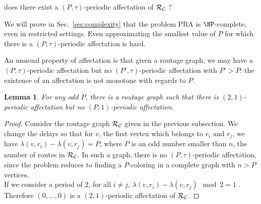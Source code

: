 \documentclass[a4paper,10pt]{article}
\newtheorem{lemma}[theorem]{Lemma}
\begin{document}
       does there exist a $(P,\tau)$-periodic affectation of $\cal R_{\cal C}$ ?


      We will prove in Sec.~\ref{sec:complexity} that the problem PRA is $\NP$-complete, even in restricted settings.
      Even approximating the smallest value of $P$ for which there is a $(P,\tau)$-periodic affectation is hard.

      An unusual property of affectation is that given a routage graph, we may have a $(P,\tau)$-periodic affectation but no
      $(P',\tau)$-periodic affectation with $P' > P$: the existence of an affectation is not monotone with regards to $P$.

	\begin{lemma} 
	 For any odd $P$, there is a routage graph such that there is $(2,1)$-periodic affectation but no $(P,1)$-periodic affectation.
	\end{lemma}
\begin{proof}

      Consider the routage graph ${\cal R_{\cal C}}$ given in the previous subsection. 
      We change the delays so that for $v$, the first vertex which belongs to $r_i$ and $r_j$,
      we have $\lambda(v,r_i) - \lambda(v,r_j)= P$, where $P$ is an odd number smaller than $n$, the number of routes in ${\cal R_{\cal C}}$. In such a graph, there is no $(P,\tau)$-periodic affectation, since the problem reduces to finding a $P$-coloring in a complete graph with $n > P$ vertices.\\
      If we consider a period of $2$, for all $i \neq j$, $\lambda(v,r_i) - \lambda(v,r_j) \mod 2 = 1$ . Therefore $(0,\dots,0)$ is a $(2,1)$-periodic affectation of ${\cal R_{\cal C}}$.

      
\end{proof}
      
% 
\end{document}
